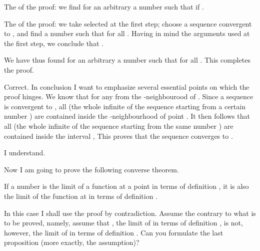 \begin{s}
The  of the proof: we find for an arbitrary  a number  such that  if . 

The  of the proof: we take \hlm{$\delta$} selected at the first step; choose a sequence  convergent to , and find a number  such that  for all . Having in mind the arguments used at the first step, we conclude that . 

We have thus found for an arbitrary  a number  such that  for all . This completes the proof.
\end{s}

\begin{p}
Correct. In conclusion I want to emphasize several essential points on which the proof hinges. We know that  for any  from the \hlm{$\delta$}-neighbourood of . Since a sequence  is convergent to , all  (the whole infinite  of the sequence  starting from a certain number ) are contained inside the \hlm{$\delta$}-neighbourhood of point . It then follows that all  (the whole infinite  of the sequence \hlm{$[f (x_{n})]$} starting from the same number ) are contained inside the interval \hlm{$] b - \varepsilon, \; b + \varepsilon[$}, This proves that the sequence \hlm{$[f (x_{n})]$} converges to .
\end{p}

\begin{s}
I understand.
\end{s}


\begin{p}
Now I am going to prove the following converse theorem.
\begin{thm}
If a number  is the limit of a function  at a point  in terms of definition , it is also the limit of the function  at  in terms of definition .
\end{thm}
In this case I shall use the proof by contradiction. Assume the contrary to what is to be proved, namely, assume that , the limit of  in terms of definition , is not, however, the limit of  in terms of definition . Can you formulate the last proposition (more exactly, the assumption)?
\end{p}

